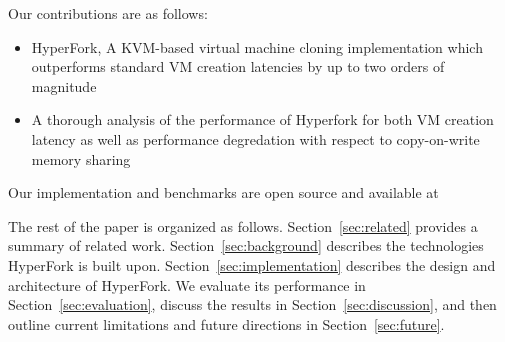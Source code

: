  Our contributions are as follows:
\begin{itemize}
\item HyperFork, A KVM-based virtual machine cloning implementation which
outperforms standard VM creation latencies by up to two orders of magnitude
\item A thorough analysis of the performance of Hyperfork for both VM creation
latency as well as performance degredation with respect to copy-on-write memory
sharing
\end{itemize}

Our implementation and benchmarks are open source and available at %

The rest of the paper is organized as follows. Section~\ref{sec:related} provides a summary of related work. Section~\ref{sec:background} describes the technologies HyperFork is built upon. Section~\ref{sec:implementation} describes the design and architecture of HyperFork. We evaluate its performance in Section~\ref{sec:evaluation}, discuss the results in Section~\ref{sec:discussion}, and then outline current limitations and future directions in Section~\ref{sec:future}.
